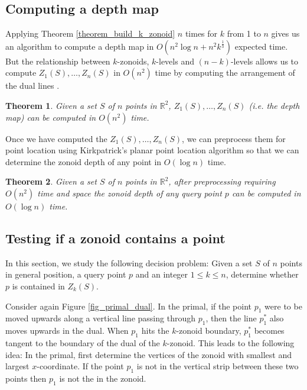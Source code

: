 \documentclass{elsart}
\newtheorem{theorem}{Theorem}
\begin{document}
\subsection{Computing a depth map}\label{subsection_computing_a_depth_map}

Applying Theorem \ref{theorem_build_k_zonoid} $n$ times for $k$ from 1
to $n$ gives us an algorithm to compute a depth map in $O(n^2 \log n +
n^2 k^{\frac{1}{3}})$ expected time. But the relationship between
$k$-zonoids, $k$-levels and $(n-k)$-levels allows us to compute
$Z_1(S),\ldots,Z_n(S)$ in $O(n^2)$ time by computing the arrangement
of the dual lines \cite{edelsbrunner_book}.

\begin{theorem}\label{theorem_build_1_to_n_zonoids}
Given a set $S$ of $n$ points in $\mathbb{R}^2$,
$Z_1(S),\ldots,Z_n(S)$ (i.e. the depth map) can be computed in
$O(n^2)$ time.
\end{theorem}

Once we have computed the $Z_1(S),\ldots,Z_n(S)$, we can preprocess
them for point location using Kirkpatrick's planar point location
algorithm \cite{optimal_search_in_planar_subdivisions} so that we can
determine the zonoid depth of any point in $O(\log n)$ time. 

\begin{theorem}\label{theorem_point_location}
Given a set $S$ of $n$ points in $\mathbb{R}^2$,
after preprocessing requiring $O(n^2)$ time and space the zonoid
depth of any query point $p$ can be computed in $O(\log n)$ time.
\end{theorem}

\subsection{Testing if a zonoid contains a point}
\label{subsection_testing_if_a_zonoid_contains_a_point}

In this section, we study the following decision problem: Given a set
$S$ of $n$ points in general position, a query point $p$ and an
integer $1 \le k \le n$, determine whether $p$ is contained in
$Z_k(S)$. 

Consider again Figure \ref{fig_primal_dual}. In the primal, if the
point $p_1$ were to be moved upwards along a vertical line passing
through $p_1$, then the line $p_1^*$ also moves upwards in the dual.
When $p_1$ hits the $k$-zonoid boundary, $p_1^*$ becomes tangent to
the boundary of the dual of the $k$-zonoid. This leads to the
following idea: In the primal, first determine the vertices of the
zonoid with smallest and largest $x$-coordinate.  If the point $p_1$
is not in the vertical strip between these two points then $p_1$ is
not the in the zonoid.
\end{document}
